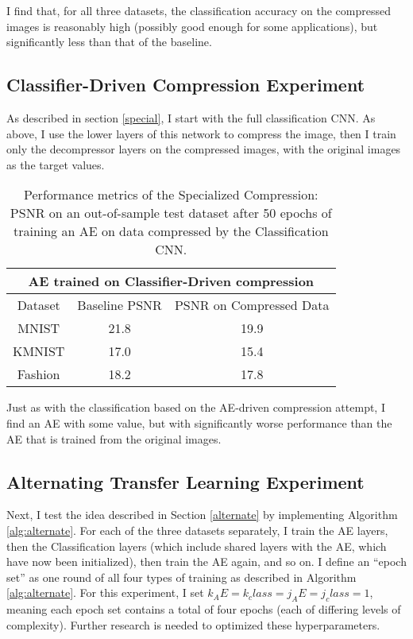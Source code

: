 \documentclass[twoside,11pt]{article}
\begin{document}
I find that, for all three datasets, the classification accuracy on the compressed images
is reasonably high (possibly good enough for some applications), but significantly 
less than that of the baseline.


\subsection{Classifier-Driven Compression Experiment} \label{expClass}

As described in section \ref{special}, I start with the full classification CNN.
As above, I use the lower layers of this network to compress the image, then I train
only the decompressor layers on the compressed images, with the original images
as the target values.


\begin{table}[h]
  \centering
  \begin{tabular}{|c||c|c|}
    \hline
    \multicolumn{3}{|c|}{AE trained on Classifier-Driven compression}\\
    \hline
    Dataset & Baseline PSNR & PSNR on Compressed Data \\
    \hline
    MNIST & 21.8 & 19.9\\
    \hline
    KMNIST & 17.0 & 15.4\\
    \hline
    Fashion & 18.2 & 17.8\\
    \hline
  \end{tabular}
  \caption{Performance metrics of the Specialized Compression: 
   PSNR on an out-of-sample test dataset after 50 epochs of training an AE on
   data compressed by the Classification CNN.}
  \label{table:special}
\end{table}

Just as with the classification based on the AE-driven compression attempt, 
I find an AE with some value, but with 
significantly worse performance than the AE that is trained from the original images.

\subsection{Alternating Transfer Learning Experiment}

Next, I test the idea described in Section \ref{alternate} by implementing Algorithm \ref{alg:alternate}.
For each of the three datasets separately, I train the AE layers, then the Classification layers
(which include shared layers with the AE, which have now been initialized), then train the AE again,
and so on. I define an ``epoch set'' as one round of all four types of training as described in 
Algorithm \ref{alg:alternate}. For this experiment, I set $k_AE = k_class = j_AE = j_class = 1$, 
meaning each epoch set contains a total of four epochs (each of differing levels of complexity).
Further research is needed to optimized these hyperparameters.
\end{document}
